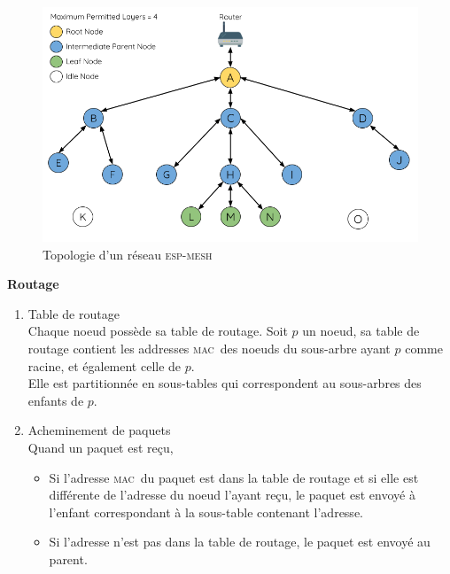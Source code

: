 \documentclass[a4paper, 12pt]{report}
\newcommand{\espmesh}{\textsc{esp-mesh}}
\newcommand{\mac}{\textsc{mac}}
\begin{document}
        \begin{figure}[H]
            \centering
            \includegraphics[scale=0.3]{images/mesh-node-types.png}
            \caption{Topologie d'un réseau \espmesh \cite{esp-mesh_w}}
        \end{figure}

        \textbf{Routage}\newline
        \begin{enumerate}
            \item Table de routage\\
                Chaque noeud possède sa table de routage. Soit $p$ un noeud, sa table de routage contient les addresses \mac\ 
                des noeuds du sous-arbre ayant $p$ comme racine, et également celle de $p$.\\
                Elle est partitionnée en sous-tables qui correspondent au sous-arbres des enfants de $p$.
            \item Acheminement de paquets\\
                Quand un paquet est reçu,
                \begin{itemize}
                    \item Si l'adresse \mac\ du paquet est dans la table de routage et si elle est différente de l'adresse du noeud l'ayant reçu, le paquet est envoyé
                    à l'enfant correspondant à la sous-table contenant l'adresse.
                    \item Si l'adresse n'est pas dans la table de routage, le paquet est envoyé au parent.
                \end{itemize}

        \end{enumerate}
        \vspace{0.5cm}
\end{document}

